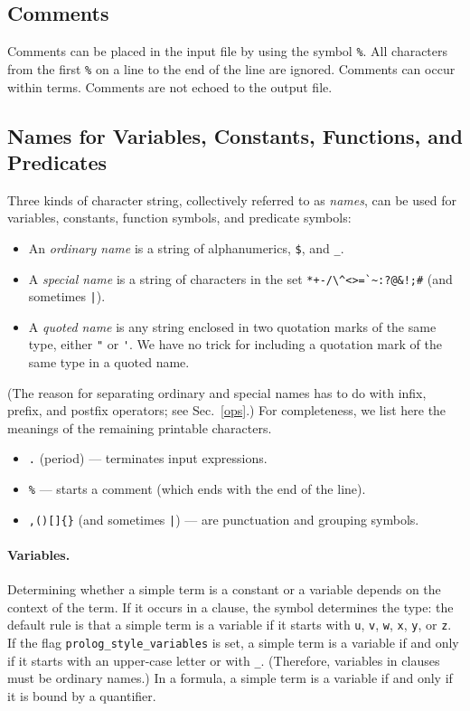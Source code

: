 \documentclass[11pt]{article}
\begin{document}
\subsection{Comments}

Comments can be placed in the input file by using the symbol \verb:%:.
All characters from the first \verb:%: on a line to the end of the
line are ignored.  Comments can occur within terms.  Comments are not
echoed to the output file.

\subsection{Names for Variables, Constants, Functions, and Predicates} \label{names}

Three kinds of character string, collectively referred to as
{\em names}, can be used for variables, constants, function
symbols, and predicate symbols:
\begin{itemize}
\item
An {\em ordinary name} is a string of alphanumerics, \verb:$:, and \verb:_:.
\item
A {\em special name} is a string of characters in the set
\verb|*+-/\^<>=`~:?@&!;#| (and sometimes \verb:|:).
\item
A {\em quoted name} is any string enclosed in two
quotation marks of the same type, either \verb:": or \verb:':.  We have
no trick for including a quotation mark of the same type in a quoted name.
\end{itemize}
(The reason for separating ordinary and special names has to do with
infix, prefix, and postfix operators; see Sec.~\ref{ops}.)
For completeness, we list here the meanings of the
remaining printable characters.

\begin{itemize}
\item
\verb:.: (period) --- terminates input expressions.
\item
\verb:%: --- starts a comment (which ends with the end of the line).
\item
\verb:,()[]{}: (and sometimes \verb:|:) --- are punctuation and grouping
symbols.
\end{itemize}

\paragraph{Variables.}

Determining whether a simple term is a constant or a variable depends
on the context of the term.  If it occurs in a clause, the symbol
determines the type: the default rule is that a simple term is a
variable if it starts with \verb:u:, \verb:v:, \verb:w:, \verb:x:,
\verb:y:, or \verb:z:.  If the flag \verb:prolog_style_variables: is
set, a simple term is a variable if and only if it starts with an
upper-case letter or with \verb:_:.  (Therefore, variables in clauses
must be ordinary names.)  In a formula, a simple term is a variable if
and only if it is bound by a quantifier.
\end{document}
